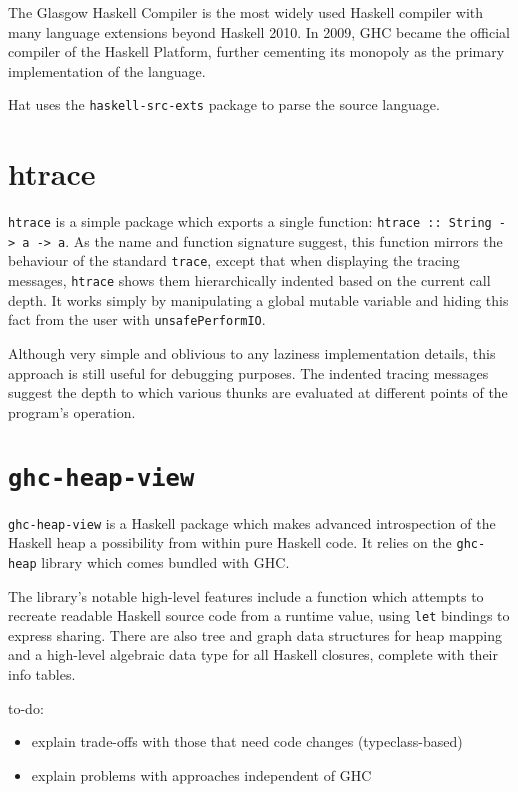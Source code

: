 \documentclass[thesis=B,english]{FITthesis}[2019/12/23]
\begin{document}
The Glasgow Haskell Compiler is the most widely used Haskell
compiler
with many language extensions beyond Haskell 2010. In 2009, GHC became the
official compiler of the Haskell Platform\cite{haskell-platform}, further
cementing its monopoly as the primary implementation of the language.

Hat uses the \texttt{haskell-src-exts} package to parse the source language.


\section{htrace}
\texttt{htrace} %
is a simple package which exports a single function: \texttt{htrace :: String
-> a -> a}. As the name and function signature suggest, this function mirrors
the behaviour of the standard \texttt{trace}, except that when displaying the
tracing messages, \texttt{htrace} shows them hierarchically indented based on
the current call depth. It works simply by manipulating a global mutable
variable and hiding this fact from the user with \texttt{unsafePerformIO}.

Although very simple and oblivious to any laziness implementation details, this
approach is still useful for debugging purposes. The indented tracing messages
suggest the depth to which various thunks are evaluated at different points of
the program's operation.

\section{\texttt{ghc-heap-view}}
\texttt{ghc-heap-view} is a Haskell package which makes advanced introspection
of the Haskell heap a possibility from within pure Haskell code. It relies on
the \texttt{ghc-heap} library which comes bundled with GHC.

The library's notable high-level features include a function which attempts to
recreate readable Haskell source code from a runtime value, using \texttt{let}
bindings to express sharing. There are also tree and graph data structures for
heap mapping and a high-level algebraic data type for all Haskell closures,
complete with their info tables.

to-do:
\begin{itemize}
	\item explain trade-offs with those that need code changes (typeclass-based)
	\item explain problems with approaches independent of GHC
\end{itemize}
\end{document}
